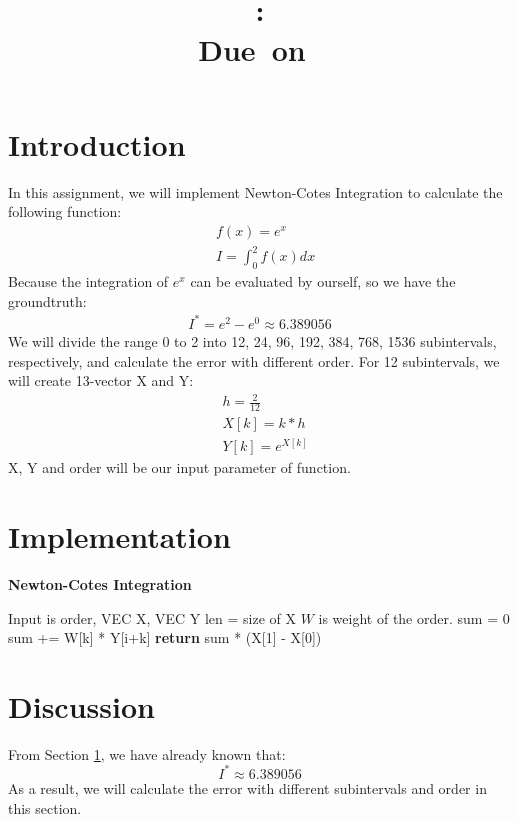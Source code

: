 \documentclass{article}
\title{
    \vspace{2in}
    \textmd{\textbf{\hmwkClass}}\\
    \textmd{\textbf{\hmwkID: \hmwkTitle}} \\
    \normalsize\vspace{0.1in}\small{Due\ on\ \hmwkDueDate}\\
    \vspace{3in}
}
\author{\textbf{\hmwkAuthorName}}
\date{} %
\begin{document}
\maketitle
\newpage

\section{Introduction}
\label{sec:intro}
In this assignment, we will implement Newton-Cotes Integration to calculate the following function:
\begin{align}
    & f(x) = e^x \\
    & I = \int_0^2f(x)dx
\end{align}
Because the integration of $e^x$ can be evaluated by ourself, so we have the groundtruth:
\begin{align}
    I^* = e^2 - e^0 \approx 6.389056
\end{align}
We will divide the range 0 to 2 into 12, 24, 96, 192, 384, 768, 1536 subintervals, respectively, and calculate the error with different
order. For 12 subintervals, we will create 13-vector X and Y:
\begin{align*}
    & h = \frac{2}{12} \\
    & X[k] = k * h \\
    & Y[k] = e^{X[k]}
\end{align*}
X, Y and order will be our input parameter of function.

\section{Implementation}
\begin{algorithm}[H]
    \caption{\textbf{Newton-Cotes Integration}}
    \begin{algorithmic}
        \State Input is order, VEC X, VEC Y
        \State len = size of X
        \State $W$ is weight of the order.
        \State sum = 0
                \State sum += W[k] * Y[i+k]
            \EndFor
        \EndFor
        \State \textbf{return} sum * (X[1] - X[0])
    \end{algorithmic}
\end{algorithm}

\section{Discussion}
From Section \ref{sec:intro}, we have already known that:
$$
    I^* \approx 6.389056
$$
As a result, we will calculate the error with different subintervals and order in this section.
\end{document}
